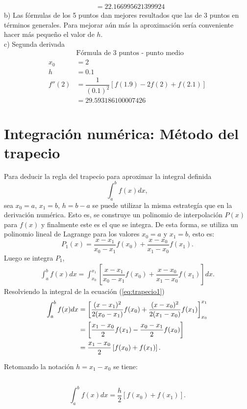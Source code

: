 \begin{exerciseT}
\begin{align*}
			&= 22.166995621399924
	\end{align*}
	b) Las fórmulas de los 5 puntos dan mejores resultados que las de 3 puntos en términos generales. Para 
	mejorar aún más la aproximación sería conveniente hacer más pequeño el valor de $h$.\\
	c) Segunda derivada
	\begin{align*}
		&\mbox{Fórmula de 3 puntos - punto medio}\\
		x_0 &= 2\\
		h &= 0.1\\
		f''(2) &= \dfrac{1}{(0.1)^2}\left[f(1.9)-2f(2)+f(2.1)\right]\\
			&= 29.593186100007426
	\end{align*}
\end{exerciseT}

\section{Integración numérica: Método del trapecio}
Para deducir la regla del trapecio para aproximar la integral definida \[\int_a^b f(x)dx, \] sea $x_0=a$, $x_1=b$, $h=b-a$  se puede
utilizar la misma estrategía que en la derivación numérica. Esto es, se construye un polinomio de interpolación $P(x)$ para $f(x)$ 
y finalmente este es el que se integra. De esta forma, se utiliza un polinomio lineal de Lagrange para los valores $x_0=a$ y $x_1=b$,
esto es: 
\[ P_1(x) = \dfrac{x-x_1}{x_0-x_1}f(x_0) + \dfrac{x-x_0}{x_1-x_0}f(x_1).\]
Luego se integra $P_1$,
\begin{align}
  \int_a^b f(x)dx = \int_{x_0}^{x_1} \left[ \dfrac{x-x_1}{x_0-x_1}f(x_0) + \dfrac{x-x_0}{x_1-x_0}f(x_1)  \right]dx.
  \label{eq:trapecio1}
\end{align}
Resolviendo la integral de la ecuación (\ref{eq:trapecio1})
\begin{align*}
  \int_a^b f(x)dx &= \left[ {(x-x_1)^2\over 2(x_0-x_1) }f(x_0) + {(x-x_0)^2\over 2(x_1-x_0)}f(x_1) \right]_{x_0}^{x_1} \\
	&= \left[ \dfrac{x_1-x_0}{2}f(x_1) - \dfrac{x_0-x_1}{2}f(x_0) \right] \\
  	&= \frac{x_1-x_0}{2}\left[f(x_0) + f(x_1)\right].
\end{align*}

Retomando la notación $h=x_1-x_0$ se tiene:
\subsection*{}
\begin{definitionT}
	\begin{equation}
		\int_a^b f(x)dx = \dfrac{h}{2}\left[f(x_0) + f(x_1)\right].
		\label{eq:reglaTrapecio} 
	\end{equation}	
\end{definitionT}

